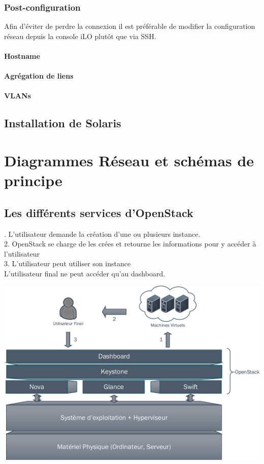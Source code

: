 \documentclass[a4paper,oneside]{report}
\begin{document}
\subsection{Post-configuration}
Afin d'éviter de perdre la connexion il est préférable de modifier la configuration réseau depuis la console iLO plutôt que via SSH.

\subsubsection{Hostname}

\subsubsection{Agrégation de liens}

\subsubsection{VLANs}

\section{Installation de Solaris} \label{sec:installsolaris}

\chapter{Diagrammes Réseau et schémas de principe}
\section{Les différents services d'OpenStack}
. L'utilisateur demande la création d'une ou plusieurs instance.\\
2. OpenStack se charge de les crées et retourne les informations pour y accéder à l'utilisateur\\
3. L'utilisateur peut utiliser son instance\\
L'utilisateur final ne peut accéder qu'au dashboard.
\begin{center}
\includegraphics[scale=0.8,angle=90]{images/principeOpenStack-crop.pdf}
\end{center}
\end{document}
